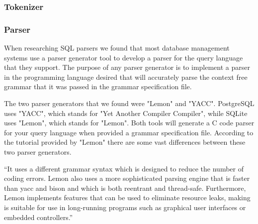 \documentclass[letterpaper]{article}
\begin{document}

\subsubsection{Tokenizer}

\subsubsection{Parser}
When researching SQL parsers we found that most database management systems use a
parser generator tool to develop a parser for the query language that they support.
The purpose of any parser generator is to implement a parser in the programming
language desired that will accurately parse the context free grammar that it 
was passed in the grammar specification file.

The two parser generators that we found were "Lemon" and "YACC". PostgreSQL uses 
"YACC", which stands for "Yet Another Compiler Compiler", while SQLite uses 
"Lemon", which stands for "Lemon". Both tools will generate a C code parser for 
your query language when provided a grammar specification file. According to the 
tutorial provided by "Lemon" there are some vast differences between these 
two parser generators. 

“It uses a different grammar syntax which is designed to reduce the number of coding
errors. Lemon also uses a more sophisticated parsing engine that is faster than yacc and
bison and which is both reentrant and thread-safe. Furthermore, Lemon implements features
that can be used to eliminate resource leaks, making is suitable for use in long-running
programs such as graphical user interfaces or embedded controllers.”\cite{lemon_parser}
\end{document}
